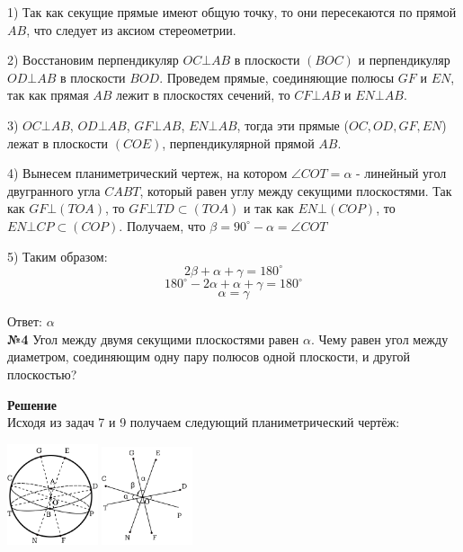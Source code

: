     1) Так как секущие прямые имеют общую точку, то они пересекаются по прямой $AB$, что следует из аксиом стереометрии.

    2) Восстановим перпендикуляр $OC\bot AB$ в плоскости $(BOC)$ и перпендикуляр $OD \bot AB$ в плоскости $BOD$.
    Проведем прямые, соединяющие полюсы $GF$ и $EN$, так как прямая $AB$ лежит в плоскостях сечений,
    то $CF \bot AB$ и $EN \bot AB$.

    3) $OC \bot AB$, $OD \bot AB$, $GF \bot AB$, $EN \bot AB$,
    тогда эти прямые ($OC, OD, GF, EN$) лежат в плоскости $(COE)$, перпендикулярной прямой $AB$.

    4) Вынесем планиметрический чертеж, на котором $\angle COT = \alpha$ - линейный угол двугранного угла $CABT$,
    который равен углу между секущими плоскостями.
    Так как $GF \bot (TOA)$, то $GF \bot TD \subset (TOA)$ и так как $EN \bot (COP)$, то $EN \bot CP \subset (COP)$.
    Получаем, что $\beta = 90^\circ - \alpha = \angle COT$

    5) Таким образом:
    \[
        2\beta + \alpha + \gamma = 180^{\circ}
    \]
    \[
        180^{\circ} - 2\alpha + \alpha + \gamma = 180 ^{\circ}
    \]
    \[ \alpha = \gamma \]

    Ответ: $\alpha$\\


    \textbf{№4}
    Угол между двумя секущими плоскостями равен $\alpha$.
    Чему равен угол между диаметром, соединяющим одну пару полюсов одной плоскости, и другой плоскостью?

    \textbf{Решение}\\

    Исходя из задач 7 и 9 получаем следующий планиметрический чертёж:

    \begin{center}
        \includegraphics[width=0.2\textwidth]{images/img7} \quad
        \includegraphics[width=0.2\textwidth]{images/img8}\\
    \end{center}

